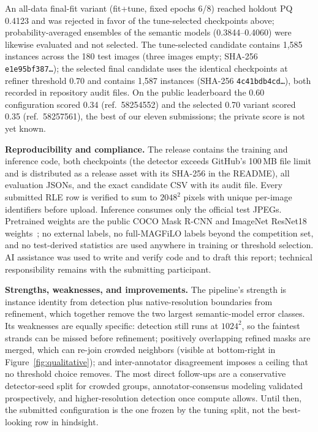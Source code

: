 \documentclass[sigconf]{acmart}
\begin{document}
An all-data final-fit variant (fit+tune, fixed epochs 6/8) reached holdout PQ 0.4123 and was rejected in favor of the tune-selected checkpoints above; probability-averaged ensembles of the semantic models (0.3844--0.4060) were likewise evaluated and not selected. The tune-selected candidate contains 1,585 instances across the 180 test images (three images empty; SHA-256 \texttt{e1e95bf387\ldots}); the selected final candidate uses the identical checkpoints at refiner threshold 0.70 and contains 1,587 instances (SHA-256 \texttt{4c41bdb4cd\ldots}), both recorded in repository audit files.
On the public leaderboard the 0.60 configuration scored 0.34 (ref.\ 58254552) and the selected 0.70 variant scored 0.35 (ref.\ 58257561), the best of our eleven submissions; the private score is not yet known.

\textbf{Reproducibility and compliance.} The release contains the training and inference code, both checkpoints (the detector exceeds GitHub's 100\,MB file limit and is distributed as a release asset with its SHA-256 in the README), all evaluation JSONs, and the exact candidate CSV with its audit file. Every submitted RLE row is verified to sum to $2048^2$ pixels with unique per-image identifiers before upload. Inference consumes only the official test JPEGs. Pretrained weights are the public COCO Mask R-CNN and ImageNet ResNet18 weights~\cite{he2017maskrcnn,he2016resnet}; no external labels, no full-MAGFiLO labels beyond the competition set, and no test-derived statistics are used anywhere in training or threshold selection. AI assistance was used to write and verify code and to draft this report; technical responsibility remains with the submitting participant.

\textbf{Strengths, weaknesses, and improvements.} The pipeline's strength is instance identity from detection plus native-resolution boundaries from refinement, which together remove the two largest semantic-model error classes. Its weaknesses are equally specific: detection still runs at $1024^2$, so the faintest strands can be missed before refinement; positively overlapping refined masks are merged, which can re-join crowded neighbors (visible at bottom-right in Figure~\ref{fig:qualitative}); and inter-annotator disagreement imposes a ceiling that no threshold choice removes. The most direct follow-ups are a conservative detector-seed split for crowded groups, annotator-consensus modeling validated prospectively, and higher-resolution detection once compute allows. Until then, the submitted configuration is the one frozen by the tuning split, not the best-looking row in hindsight.
\end{document}
